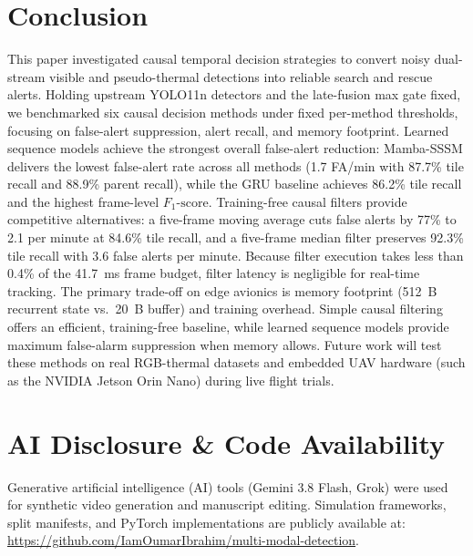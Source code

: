 \documentclass[conference]{IEEEtran}
\begin{document}
\balance

\section{Conclusion}
This paper investigated causal temporal decision strategies to convert noisy dual-stream visible and pseudo-thermal detections into reliable search and rescue alerts. Holding upstream YOLO11n detectors and the late-fusion max gate fixed, we benchmarked six causal decision methods under fixed per-method thresholds, focusing on false-alert suppression, alert recall, and memory footprint. Learned sequence models achieve the strongest overall false-alert reduction: Mamba-SSSM delivers the lowest false-alert rate across all methods (1.7 FA/min with 87.7\% tile recall and 88.9\% parent recall), while the GRU baseline achieves 86.2\% tile recall and the highest frame-level $F_1\text{-score}$. Training-free causal filters provide competitive alternatives: a five-frame moving average cuts false alerts by 77\% to 2.1 per minute at 84.6\% tile recall, and a five-frame median filter preserves 92.3\% tile recall with 3.6 false alerts per minute. Because filter execution takes less than 0.4\% of the 41.7~ms frame budget, filter latency is negligible for real-time tracking. The primary trade-off on edge avionics is memory footprint (512~B recurrent state vs.\ 20~B buffer) and training overhead. Simple causal filtering offers an efficient, training-free baseline, while learned sequence models provide maximum false-alarm suppression when memory allows. Future work will test these methods on real RGB-thermal datasets and embedded UAV hardware (such as the NVIDIA Jetson Orin Nano) during live flight trials.

\section*{AI Disclosure \& Code Availability}
Generative artificial intelligence (AI) tools (Gemini 3.8 Flash, Grok) were used for synthetic video generation and manuscript editing. Simulation frameworks, split manifests, and PyTorch implementations are publicly available at: \url{https://github.com/IamOumarIbrahim/multi-modal-detection}.



\end{document}
